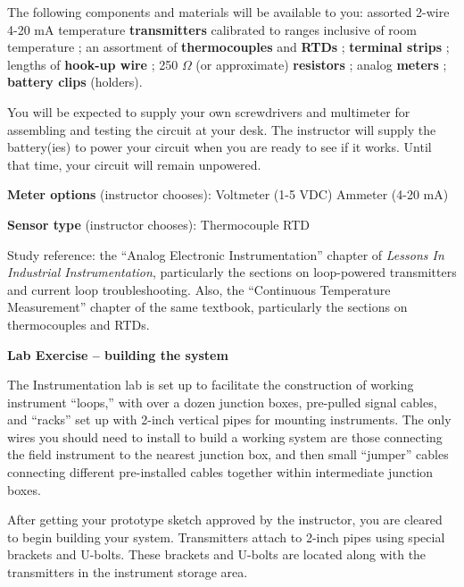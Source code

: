 \vskip 10pt

The following components and materials will be available to you: assorted 2-wire 4-20 mA temperature {\bf transmitters} calibrated to ranges inclusive of room temperature ; an assortment of {\bf thermocouples} and {\bf RTDs} ; {\bf terminal strips} ; lengths of {\bf hook-up wire} ; 250 $\Omega$ (or approximate) {\bf resistors} ; analog {\bf meters} ; {\bf battery clips} (holders).

\vskip 10pt

You will be expected to supply your own screwdrivers and multimeter for assembling and testing the circuit at your desk.  The instructor will supply the battery(ies) to power your circuit when you are ready to see if it works.  Until that time, your circuit will remain unpowered.

\vskip 10pt

\noindent
{\bf Meter options} (instructor chooses): \hskip 20pt \underbar{\hskip 20pt} Voltmeter (1-5 VDC) \hskip 20pt \underbar{\hskip 20pt} Ammeter (4-20 mA)

\vskip 10pt

\noindent
{\bf Sensor type} (instructor chooses): \hskip 20pt \underbar{\hskip 20pt} Thermocouple \hskip 20pt \underbar{\hskip 20pt} RTD

\vfil

Study reference: the ``Analog Electronic Instrumentation'' chapter of {\it Lessons In Industrial Instrumentation}, particularly the sections on loop-powered transmitters and current loop troubleshooting.  Also, the ``Continuous Temperature Measurement'' chapter of the same textbook, particularly the sections on thermocouples and RTDs.



\vfil \eject

\noindent
{\bf Lab Exercise -- building the system}

\vskip 5pt

The Instrumentation lab is set up to facilitate the construction of working instrument ``loops,'' with over a dozen junction boxes, pre-pulled signal cables, and ``racks'' set up with 2-inch vertical pipes for mounting instruments.  The only wires you should need to install to build a working system are those connecting the field instrument to the nearest junction box, and then small ``jumper'' cables connecting different pre-installed cables together within intermediate junction boxes.

After getting your prototype sketch approved by the instructor, you are cleared to begin building your system.  Transmitters attach to 2-inch pipes using special brackets and U-bolts.  These brackets and U-bolts are located along with the transmitters in the instrument storage area.  

